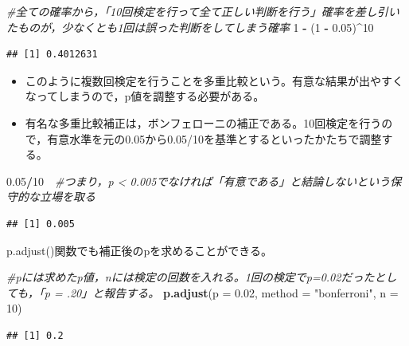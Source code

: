 \documentclass[]{article}
\newenvironment{Shaded}{\begin{snugshade}}{\end{snugshade}}
\newcommand{\KeywordTok}[1]{\textcolor[rgb]{0.13,0.29,0.53}{\textbf{#1}}}
\newcommand{\DataTypeTok}[1]{\textcolor[rgb]{0.13,0.29,0.53}{#1}}
\newcommand{\DecValTok}[1]{\textcolor[rgb]{0.00,0.00,0.81}{#1}}
\newcommand{\FloatTok}[1]{\textcolor[rgb]{0.00,0.00,0.81}{#1}}
\newcommand{\StringTok}[1]{\textcolor[rgb]{0.31,0.60,0.02}{#1}}
\newcommand{\CommentTok}[1]{\textcolor[rgb]{0.56,0.35,0.01}{\textit{#1}}}
\newcommand{\OperatorTok}[1]{\textcolor[rgb]{0.81,0.36,0.00}{\textbf{#1}}}
\newcommand{\NormalTok}[1]{#1}
\begin{document}
\begin{Shaded}
\begin{Highlighting}[]
\CommentTok{#全ての確率から，「10回検定を行って全て正しい判断を行う」確率を差し引いたものが，少なくとも1回は誤った判断をしてしまう確率}
\DecValTok{1} \OperatorTok{-}\StringTok{ }\NormalTok{(}\DecValTok{1} \OperatorTok{-}\StringTok{ }\FloatTok{0.05}\NormalTok{)}\OperatorTok{^}\DecValTok{10}
\end{Highlighting}
\end{Shaded}

\begin{verbatim}
## [1] 0.4012631
\end{verbatim}

\begin{itemize}
\item
  このように複数回検定を行うことを多重比較という。有意な結果が出やすくなってしまうので，p値を調整する必要がある。
\item
  有名な多重比較補正は，ボンフェローニの補正である。10回検定を行うので，有意水準を元の0.05から0.05/10を基準とするといったかたちで調整する。
\end{itemize}

\begin{Shaded}
\begin{Highlighting}[]
\FloatTok{0.05}\OperatorTok{/}\DecValTok{10}　\CommentTok{#つまり，p < 0.005でなければ「有意である」と結論しないという保守的な立場を取る}
\end{Highlighting}
\end{Shaded}

\begin{verbatim}
## [1] 0.005
\end{verbatim}

p.adjust()関数でも補正後のpを求めることができる。

\begin{Shaded}
\begin{Highlighting}[]
\CommentTok{#pには求めたp値，nには検定の回数を入れる。1回の検定でp=0.02だったとしても，「p = .20」と報告する。}
\KeywordTok{p.adjust}\NormalTok{(}\DataTypeTok{p =} \FloatTok{0.02}\NormalTok{, }\DataTypeTok{method =} \StringTok{"bonferroni"}\NormalTok{, }\DataTypeTok{n =} \DecValTok{10}\NormalTok{)}
\end{Highlighting}
\end{Shaded}

\begin{verbatim}
## [1] 0.2
\end{verbatim}
\end{document}
